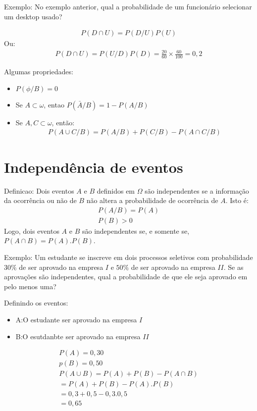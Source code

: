 \documentclass[11pt,a4paper]{book}
\begin{document}
\begin{enumerate}[label=(\alph*)]
\begin{enumerate}
Exemplo: No exemplo anterior, qual a probabilidade de um funcionário selecionar um 
desktop usado?
\begin{figure}
\end{figure}
\begin{align}
  P(D \cap U)= P(D/U)P(U)
\end{align}
Ou:
\begin{align}
  P(D \cap U)= P(U/D)P(D)= \frac{20}{60}\times \frac{60}{100}= 0,2
\end{align}

Algumas propriedades:
\begin{itemize}
  \item $P(\phi / B)=0$
  \item Se $A \subset \omega$, entao $P(\bar{A} / B)= 1-P(A/B)$
  \item Se $A,C \subset \omega$, então:
    \begin{align}
      P(A \cup C / B)= P(A/B)+ P(C/B) - P(A \cap C/B)
    \end{align}
\end{itemize}
\section{Independência de eventos}
Definicao: Dois eventos $A$ e $B$ definidos em $\Omega$ são independentes se 
a informação da ocorrência ou não de $B$ não altera a probabilidade de ocorrência
de $A$. Isto é:
\begin{align}
  P(A/B)= P(A) \\
  P(B)>0 
\end{align}
Logo, dois eventos $A$ e $B$ são independentes se, e somente se, $P(A \cap B)=P(A).P(B)$.

Exemplo: Um estudante se inscreve em dois processos seletivos com probabilidade 
$30\%$ de ser aprovado na empresa $I$ e $50\%$ de ser aprovado na empresa $II$. Se 
as aprovações são independentes, qual a probabilidade de que ele seja aprovado em
pelo menos uma?

Definindo os eventos:
\begin{itemize}
  \item A:\@ O estudante ser aprovado na empresa $I$
  \item B:\@ O esutdanbte ser aprovado na empresa $II$
\end{itemize}
\begin{align}
  P(A)= 0,30\\
  p(B)=0,50\\
  P(A\cup B)= P(A)+P(B)-P(A\cap B)\\
  =P(A)+P(B)-P(A).P(B)\\
  =0,3+0,5-0,3.0,5\\
  =0,65
\end{align}

\end{enumerate}
\end{enumerate}
\end{document}
